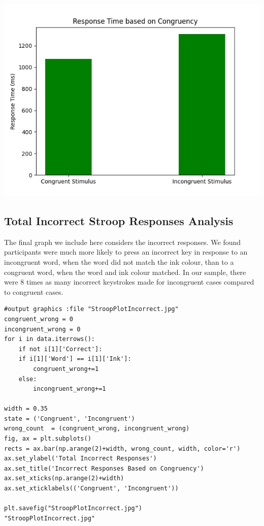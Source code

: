 \documentclass{article}
\begin{document}
\begin{center}
\includegraphics[width=.9\linewidth]{StroopPlotAverage.jpg}
\end{center}

\pagebreak


\subsection{Total Incorrect Stroop Responses Analysis}
\label{sec:org60e4e20}

The final graph we include here considers the incorrect responses. We found participants were much more likely to press an incorrect key in response to an incongruent word, when the word did not match the ink colour, than to a congruent word, when the word and ink colour matched. In our sample, there were 8 times as many incorrect keystrokes made for incongruent cases compared to congruent cases.

\begin{verbatim}
#output graphics :file "StroopPlotIncorrect.jpg"
congruent_wrong = 0
incongruent_wrong = 0
for i in data.iterrows():
    if not i[1]['Correct']:
	if i[1]['Word'] == i[1]['Ink']:
	    congruent_wrong+=1
	else:
	    incongruent_wrong+=1

width = 0.35
state = ('Congruent', 'Incongruent')
wrong_count  = (congruent_wrong, incongruent_wrong)
fig, ax = plt.subplots()
rects = ax.bar(np.arange(2)+width, wrong_count, width, color='r')
ax.set_ylabel('Total Incorrect Responses')
ax.set_title('Incorrect Responses Based on Congruency')
ax.set_xticks(np.arange(2)+width)
ax.set_xticklabels(('Congruent', 'Incongruent'))

plt.savefig("StroopPlotIncorrect.jpg")
"StroopPlotIncorrect.jpg"
\end{verbatim}
\end{document}
